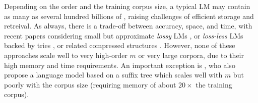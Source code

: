 Depending on the order and the training corpus size, a typical \ngram
LM may contain as many as several hundred billions of \ngrams
\cite{brants2007large},
raising challenges of efficient storage and retreival.
%
As always, there is a trade-off between accuracy, space, and time, with recent papers considering small but approximate  \emph{lossy} LMs 
\cite{Chazelle:2004:BFE:982792.982797,DBLP:conf/acl/TalbotO07,guthrie2010storing},
or \emph{loss-less} LMs 
backed by tries \cite{stolcke2011srilm},
or related compressed structures 
\cite{Germann:2009:TPT:1621947.1621952,heafield2011kenlm,pauls2011faster,sall11,DBLP:conf/acl/WatanabeTI09}.
However, none of these approaches scale well to very high-order $m$
or very large corpora, due to their high memory and time requirements.
An important exception is
, who also propose a language model
based on a suffix tree which scales well with $m$ but poorly with the corpus size (requiring memory of
about $20\times$ the training corpus).


%
% 


